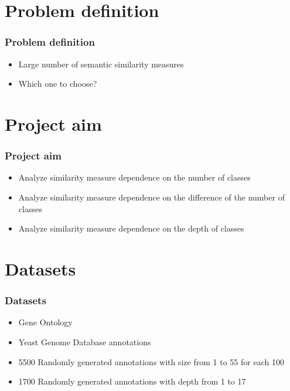 \documentclass{beamer}
\begin{document}

\section{Problem definition}

\begin{frame}
\frametitle{Problem definition}
\begin{itemize}
\item Large number of semantic similarity measures
\item Which one to choose?
\end{itemize}
\end{frame}


\section{Project aim}

\begin{frame}
\frametitle{Project aim}
\begin{itemize}
\item Analyze similarity measure dependence on the number of classes
\item Analyze similarity measure dependence on the difference of the number of classes
\item Analyze similarity measure dependence on the depth of classes
\end{itemize}
\end{frame}


\section{Datasets}


\begin{frame}
\frametitle{Datasets}
\begin{itemize}
\item Gene Ontology
\item Yeast Genome Database annotations
\item 5500 Randomly generated annotations with size from 1 to 55 for each 100
\item 1700 Randomly generated annotations with depth from 1 to 17
\end{itemize}
\end{frame}
\end{document}
